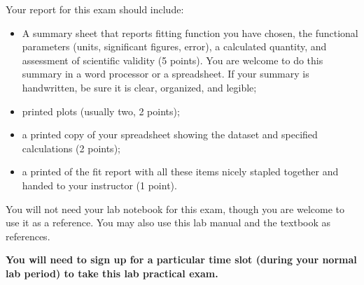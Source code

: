 Your report for this exam should include:
\begin{itemize}
\item
A summary sheet that %
reports  fitting function you have chosen, the functional parameters (units, significant figures, error), a
calculated quantity, and assessment of scientific validity (5 points).  You are welcome to do this summary in a word processor or a spreadsheet.  If your summary is handwritten, be sure it is clear, organized, and legible;
\item
printed plots (usually two, 2 points);
\item
a printed copy of your spreadsheet showing the dataset and 
specified calculations  (2 points);
\item
a printed of the fit report with all these items nicely stapled together
and handed to your instructor (1 point).
\end{itemize}
You will not need your lab notebook for this exam, though you are welcome to use it as a reference.  You may also use this lab manual and the textbook
as references.

{\bf You will need to sign up for a particular time slot (during your normal lab period) to take this lab practical exam.}
